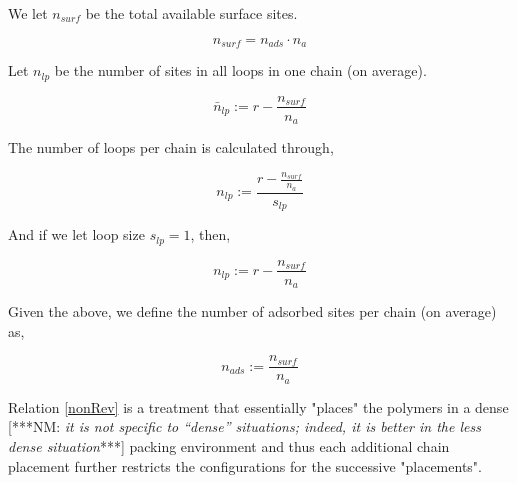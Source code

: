 \documentclass[10pt,letterpaper]{article}
\begin{document}
\noindent We let $n_{surf}$ be the total available surface sites.

\begin{equation}
	\boxed{n_{surf}=n_{ads}\cdotp n_{a}}
	\label{nsurf}
\end{equation}



\noindent Let $n_{lp}$ be the number of sites in all loops 
in one chain (on average).

\begin{equation}
	\boxed{\bar{n}_{lp}:=r-\frac{n_{surf}}{n_a}}
	\label{mean nlp}
\end{equation}


\noindent The number of loops per 
chain is calculated through,


\begin{equation}
	\boxed{n_{lp}:= \frac{r-\frac{n_{surf}}{n_a}}{s_{lp}}}
	\label{nlp,Gen}
\end{equation}


\noindent And if we let loop size $s_{lp}=1$, then,


\begin{equation}
\boxed{n_{lp}:= r-\frac{n_{surf}}{n_a}}
\label{nlp}
\end{equation}

%






\noindent Given the above, we define the number of adsorbed sites per chain (on average) as,

\begin{equation}
	\boxed{n_{ads}:= \frac{n_{surf}}{n_a}}
	\label{nads}
\end{equation}






\noindent Relation \ref{nonRev} is a treatment that essentially "places" the polymers in a dense
[***NM:  \textit{it is not specific to ``dense''
situations; indeed, it is better in the less dense 
situation}***]
packing environment and thus each additional chain placement further restricts the configurations for the successive "placements". 
\end{document}
